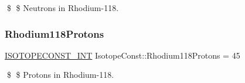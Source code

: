 \$ \$ Neutrons in Rhodium-\/118. \mbox{\label{group___isotope_const-_rhodium-_rh118_ga9a437250d830b4f2604fec098b66b097}} 
\subsubsection{\texorpdfstring{Rhodium118\+Protons}{Rhodium118Protons}}
{\footnotesize\ttfamily \mbox{\hyperlink{group___isotope_const-_macros_ga5f18360b3e99483a35c32d789e62621c}{I\+S\+O\+T\+O\+P\+E\+C\+O\+N\+S\+T\+\_\+\+I\+NT}} Isotope\+Const\+::\+Rhodium118\+Protons = 45}

\$ \$ Protons in Rhodium-\/118. 